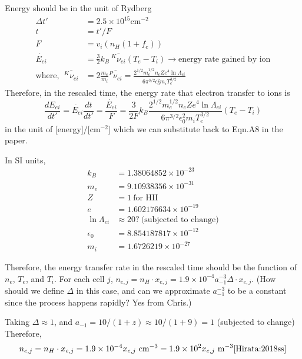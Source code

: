 \documentclass{article}
\begin{document}
Energy should be in the unit of Rydberg
\begin{equation}
\begin{split}
	\Delta t' &= 2.5\times 10^{15} \text{cm}^{-2}\\
	t &= t'/F\\
	F &= v_i(n_H(1+f_e))\\
	\dot{E_{ei}} &= \frac{3}{2}k_B\ \bar{^K\nu_{ei}}(T_e - T_i) \rightarrow \text{energy rate gained by ion}\\
	\text{where},\ \ \bar{^K\nu_{ei}} &= 2\frac{m_e}{m_i} \bar{^P\nu_{ei}} = \frac{2^{1/2}m_e^{1/2}n_eZe^4\ln\Lambda_{ei}}{6\pi^{3/2}\epsilon_0^2m_iT_e^{3/2}}
	\end{split}
\end{equation}
Therefore, in the rescaled time, the energy rate that electron transfer to ions is
\begin{equation}
	\frac{d E_{ei}}{d t'} = \dot{E_{ei}} \frac{dt}{dt'} = \frac{\dot{E_{ei}}}{F} = \frac{3}{2F}k_B\frac{2^{1/2}m_e^{1/2}n_eZe^4\ln\Lambda_{ei}}{6\pi^{3/2}\epsilon_0^2m_iT_e^{3/2}} (T_e - T_i)
\end{equation}
in the unit of [energy]/[cm$^{-2}$] which we can substitute back to Eqn.A8 in the paper.

In SI units,
\begin{equation}
	\begin{split}
		k_B &= 1.38064852 \times 10^{-23}\\
		m_e &= 9.10938356 \times 10^{-31}\\
		Z &= 1\ \text{for HII}\\
		e &= 1.602176634 \times 10^{-19}\\
    	\ln\Lambda_{ei} &\approx 20 ?\ \text{(subjected to change)} \\
    	\epsilon_0 &= 8.854187817 \times 10^{-12}\\
    	m_i &= 1.6726219 \times 10^{-27}
	\end{split}
\end{equation}

Therefore, the energy transfer rate in the rescaled time should be the function of $n_e$, $T_e$, and $T_i$. For each cell $j$, $n_{e,j}=n_H \cdot x_{e,j} = 1.9\times10^{-4}a_{-1}^{-3}\Delta \cdot x_{e,j}$. (How should we define $\Delta$ in this case, and can we approximate $a_{-1}^{-3}$ to be a constant since the process happens rapidly? Yes from Chris.)

Taking $\Delta \approx 1$, and $a_{-1} = 10/(1+z) \approx 10/(1+9) = 1$ (subjected to change) Therefore,
\begin{equation}
	n_{e,j} = n_H \cdot x_{e,j} = 1.9\times10^{-4} x_{e,j}\ \text{cm}^{-3} = 1.9\times10^{2}  x_{e,j} \ \text{m}^{-3} \cite{Hirata:2018ss}
\end{equation}
\end{document}
